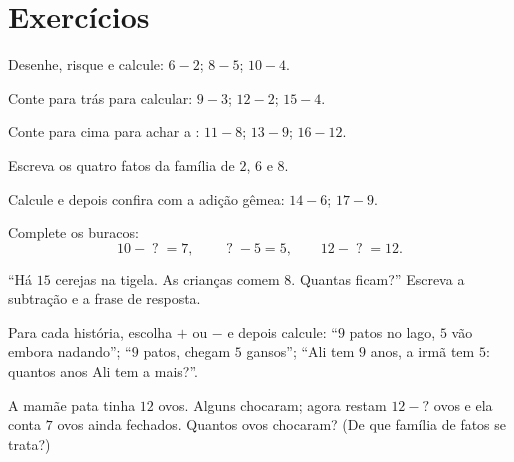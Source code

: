 \section{Exercícios}

\begin{exercise}[$\star$]\label{exo:g1:subtraction:1}
Desenhe, risque e calcule: $6 - 2$; \quad $8 - 5$; \quad
$10 - 4$.
\end{exercise}

\begin{exercise}[$\star$]\label{exo:g1:subtraction:2}
Conte para trás para calcular: $9 - 3$; \quad $12 - 2$; \quad
$15 - 4$.
\end{exercise}

\begin{exercise}[$\star$]\label{exo:g1:subtraction:3}
Conte para cima para achar a : $11 - 8$; \quad
$13 - 9$; \quad $16 - 12$.
\end{exercise}

\begin{exercise}[$\star$]\label{exo:g1:subtraction:4}
Escreva os quatro fatos da família de $2$, $6$ e $8$.
\end{exercise}

\begin{exercise}[$\star$]\label{exo:g1:subtraction:5}
Calcule e depois confira com a adição gêmea: $14 - 6$; \quad
$17 - 9$.
\end{exercise}

\begin{exercise}[$\star$]\label{exo:g1:subtraction:6}
Complete os buracos:
\[
10 - \;?\; = 7, \qquad
\;?\; - 5 = 5, \qquad
12 - \;?\; = 12 .
\]
\end{exercise}

\begin{exercise}[$\star$]\label{exo:g1:subtraction:7}
``Há $15$ cerejas na tigela. As crianças comem $8$. Quantas ficam?''
Escreva a subtração e a frase de resposta.
\end{exercise}

\begin{exercise}[$\star$]\label{exo:g1:subtraction:8}
Para cada história, escolha $+$ ou $-$ e depois calcule: ``$9$ patos
no lago, $5$ vão embora nadando''; ``$9$ patos, chegam $5$
gansos''; ``Ali tem $9$ anos, a irmã tem $5$: quantos anos Ali tem a
mais?''.
\end{exercise}

\begin{exercise}[$\star\star$]\label{exo:g1:subtraction:9}
A mamãe pata tinha $12$ ovos. Alguns chocaram; agora restam
$12 - ?$ ovos e ela conta $7$ ovos ainda fechados. Quantos ovos
chocaram? (De que família de fatos se trata?)
\end{exercise}
